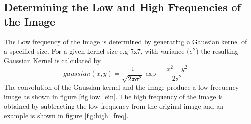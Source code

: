\documentclass[a4paper,12pt]{article}
\begin{document}
	\subsection{Determining the Low and High Frequencies of the Image}
	The Low frequency of the image is determined by generating a Gaussian kernel of a specified size. For a given kernel size e.g 7x7, with variance ($\sigma^2$) the resulting Gaussian Kernel is calculated by 
		\begin{equation}
			gaussian(x,y) = \frac{1}{\sqrt{2\pi\sigma^2}}\exp-\frac{x^2 + y^2}{2\sigma^2}
		\end{equation} 
	The convolution of the Gaussian kernel and the image produce a low frequency image as shown in figure \ref{fig:low_ein}. The high frequency of the image is obtained by subtracting the low frequency from the original image and an example is shown in figure \ref{fig:high_freq}.
\end{document}
